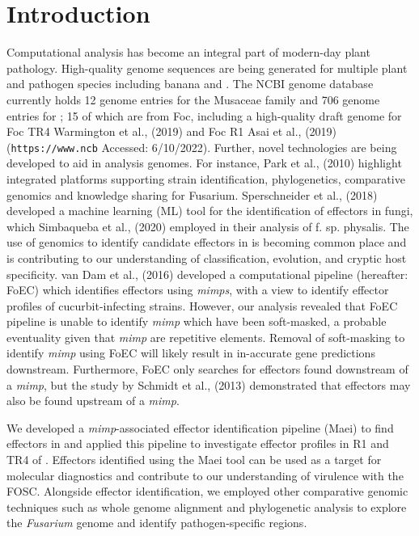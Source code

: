 \section{Introduction}

Computational analysis has become an integral part of modern-day plant pathology. High-quality genome sequences are being generated for multiple plant and pathogen species including banana and \Fo. The NCBI genome database currently holds 12 genome entries for the Musaceae family and 706 genome entries for \Fo; 15 of which are from Foc, including a high-quality draft genome for Foc TR4 Warmington et al., (2019) and Foc R1 Asai et al., (2019) (\texttt{https://www.ncb} Accessed: 6/10/2022).  Further, novel technologies are being developed to aid in analysis \Fo genomes. For instance, Park et al., (2010) highlight integrated platforms supporting strain identification, phylogenetics, comparative genomics and knowledge sharing for Fusarium. Sperschneider et al., (2018) developed a machine learning (ML) tool for the identification of effectors in fungi, which Simbaqueba et al., (2020) employed in their analysis of \Fo f. sp. physalis. The use of genomics to identify candidate effectors in \Fo is becoming common place and is contributing to our understanding of \Fo classification, evolution, and cryptic host specificity. 
van Dam et al., (2016) developed a computational pipeline (hereafter: FoEC) which identifies effectors using \textit{\textit{mimp}s}, with a view to identify effector profiles of  cucurbit-infecting \Fo strains. However, our analysis revealed that FoEC pipeline is unable to identify \textit{\textit{mimp}} which have been soft-masked, a probable eventuality given that \textit{\textit{mimp}} are repetitive elements. Removal of soft-masking to identify \textit{\textit{mimp}} using FoEC will likely result in in-accurate gene predictions downstream. Furthermore, FoEC only searches for effectors found downstream of a \textit{mimp}, but the study by Schmidt et al., (2013) demonstrated that effectors may also be found upstream of a \textit{mimp}. 

We developed a \textit{mimp}-associated effector identification pipeline (Maei) to find effectors in \Fo and applied this pipeline to investigate effector profiles in R1 and TR4 of \Foc. Effectors identified using the Maei tool can be used as a target for molecular diagnostics and contribute to our understanding of virulence with the FOSC.  Alongside effector identification, we employed other comparative genomic techniques such as whole genome alignment and phylogenetic analysis to explore the \textit{Fusarium} genome and identify pathogen-specific regions. 

